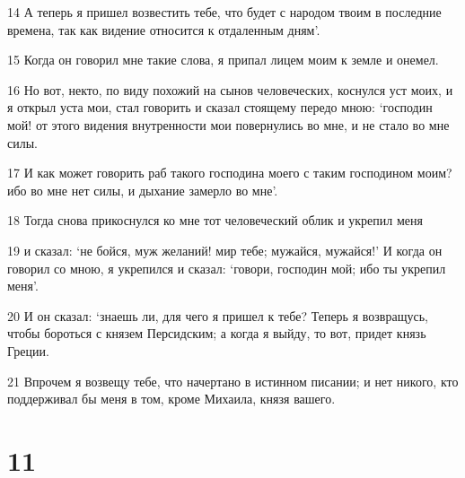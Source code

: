 \par 14 А теперь я пришел возвестить тебе, что будет с народом твоим в последние времена, так как видение относится к отдаленным дням'.
\par 15 Когда он говорил мне такие слова, я припал лицем моим к земле и онемел.
\par 16 Но вот, некто, по виду похожий на сынов человеческих, коснулся уст моих, и я открыл уста мои, стал говорить и сказал стоящему передо мною: `господин мой! от этого видения внутренности мои повернулись во мне, и не стало во мне силы.
\par 17 И как может говорить раб такого господина моего с таким господином моим? ибо во мне нет силы, и дыхание замерло во мне'.
\par 18 Тогда снова прикоснулся ко мне тот человеческий облик и укрепил меня
\par 19 и сказал: `не бойся, муж желаний! мир тебе; мужайся, мужайся!' И когда он говорил со мною, я укрепился и сказал: `говори, господин мой; ибо ты укрепил меня'.
\par 20 И он сказал: `знаешь ли, для чего я пришел к тебе? Теперь я возвращусь, чтобы бороться с князем Персидским; а когда я выйду, то вот, придет князь Греции.
\par 21 Впрочем я возвещу тебе, что начертано в истинном писании; и нет никого, кто поддерживал бы меня в том, кроме Михаила, князя вашего.

\chapter{11}

